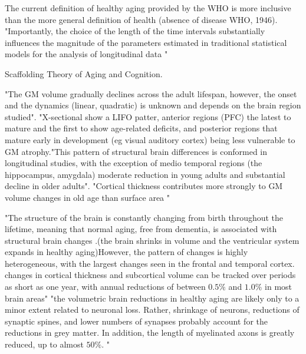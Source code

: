 \documentclass[twoside,onecolumn]{article}
\begin{document}



The current definition of healthy aging provided by the WHO is more inclusive than the more general definition of health (absence of disease WHO, 1946).
"Importantly, the choice of the length of the time intervals substantially influences the magnitude of the parameters estimated in traditional statistical models for the analysis of longitudinal data "

Scaffolding Theory of Aging and Cognition. 

"The GM volume gradually declines across the adult lifespan, however, the onset and the dynamics (linear, quadratic) is unknown and depends on the brain region studied".
"X-sectional show a LIFO patter, anterior regions (PFC) the latest to mature and the first to show age-related deficits, and posterior regions that mature early in development (eg visual auditory cortex) being less vulnerable to GM atrophy."This pattern of structural brain differences is conformed in longitudinal studies, with the exception of medio temporal regions (the hippocampus, amygdala) moderate reduction in young adults and substantial decline in older adults".
"Cortical thickness contributes more strongly to GM volume changes in old age than surface area \cite{storsve2014differential}"



"The structure of the brain is constantly changing from birth throughout the lifetime, meaning that normal aging, free from dementia, is associated with structural brain changes  \cite{fjell2010structural}.(the brain shrinks in volume and the ventricular system expands in healthy aging)However, the pattern of changes is highly heterogeneous, with the largest changes seen in the frontal and temporal cortex.  changes in cortical thickness and subcortical volume can be tracked over periods as short as one year, with annual reductions of between $0.5\%$ and $1.0\%$ in most brain areas"
"the volumetric brain reductions in healthy aging are likely only to a minor extent related to neuronal loss. Rather, shrinkage of neurons, reductions of synaptic spines, and lower numbers of synapses probably account for the reductions in grey matter. In addition, the length of myelinated axons is greatly reduced, up to almost $50\%$. "
\end{document}
